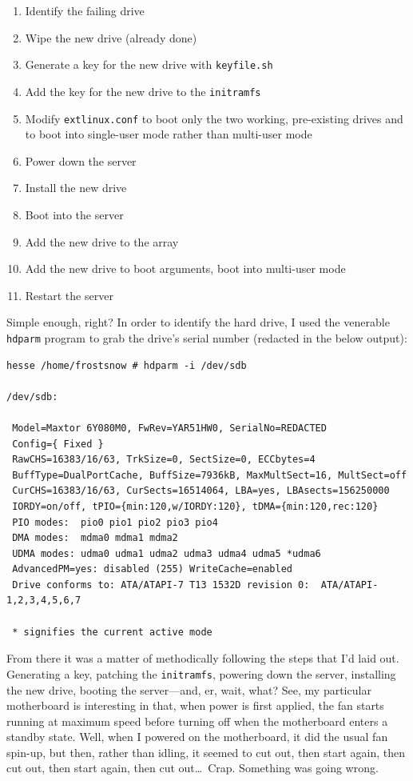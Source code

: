\documentclass{article}
\begin{document}
\begin{enumerate}
\item Identify the failing drive
\item Wipe the new drive (already done)
\item Generate a key for the new drive with \texttt{keyfile.sh}
\item Add the key for the new drive to the \texttt{initramfs}
\item Modify \texttt{extlinux.conf} to boot only the two working, pre-existing drives and to boot into single-user mode rather than multi-user mode
\item Power down the server
\item Install the new drive
\item Boot into the server
\item Add the new drive to the array
\item Add the new drive to boot arguments, boot into multi-user mode
\item Restart the server
\end{enumerate}

Simple enough, right?  In order to identify the hard drive, I used the venerable \texttt{hdparm} program to grab the drive's serial number (redacted in the below output):

\begin{verbatim}
hesse /home/frostsnow # hdparm -i /dev/sdb

/dev/sdb:

 Model=Maxtor 6Y080M0, FwRev=YAR51HW0, SerialNo=REDACTED
 Config={ Fixed }
 RawCHS=16383/16/63, TrkSize=0, SectSize=0, ECCbytes=4
 BuffType=DualPortCache, BuffSize=7936kB, MaxMultSect=16, MultSect=off
 CurCHS=16383/16/63, CurSects=16514064, LBA=yes, LBAsects=156250000
 IORDY=on/off, tPIO={min:120,w/IORDY:120}, tDMA={min:120,rec:120}
 PIO modes:  pio0 pio1 pio2 pio3 pio4
 DMA modes:  mdma0 mdma1 mdma2
 UDMA modes: udma0 udma1 udma2 udma3 udma4 udma5 *udma6
 AdvancedPM=yes: disabled (255) WriteCache=enabled
 Drive conforms to: ATA/ATAPI-7 T13 1532D revision 0:  ATA/ATAPI-1,2,3,4,5,6,7

 * signifies the current active mode
\end{verbatim}

From there it was a matter of methodically following the steps that I'd laid out.  Generating a key, patching the \texttt{initramfs}, powering down the server, installing the new drive, booting the server---and, er, wait, what?  See, my particular motherboard is interesting in that, when power is first applied, the fan starts running at maximum speed before turning off when the motherboard enters a standby state.  Well, when I powered on the motherboard, it did the usual fan spin-up, but then, rather than idling, it seemed to cut out, then start again, then cut out, then start again, then cut out\ldots~Crap.  Something was going wrong.
\end{document}

